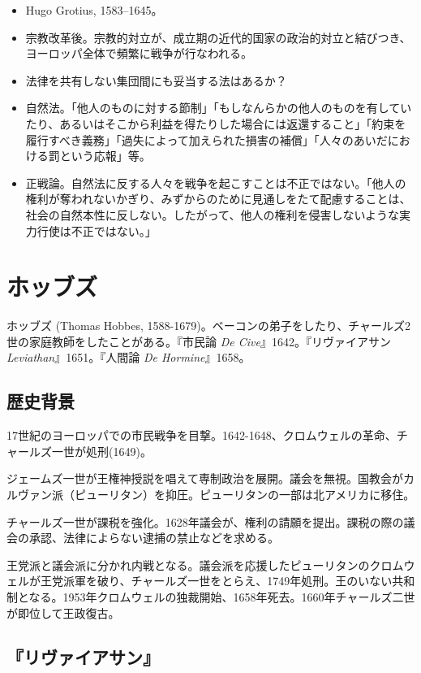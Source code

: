 \documentclass[uplatex,dvipdfmx]{jsarticle} \usepackage{mystyle}%
\begin{document}
 \begin{itemize}
 \item Hugo Grotius, 1583--1645。
 \item 宗教改革後。宗教的対立が、成立期の近代的国家の政治的対立と結びつき、ヨーロッパ全体で頻繁に戦争が行なわれる。
 \item 法律を共有しない集団間にも妥当する法はあるか？
 \item 自然法。「他人のものに対する節制」「もしなんらかの他人のものを有していたり、あるいはそこから利益を得たりした場合には返還すること」「約束を履行すべき義務」「過失によって加えられた損害の補償」「人々のあいだにおける罰という応報」等。
 \item 正戦論。自然法に反する人々を戦争を起こすことは不正ではない。「他人の権利が奪われないかぎり、みずからのために見通しをたて配慮することは、社会の自然本性に反しない。したがって、他人の権利を侵害しないような実力行使は不正ではない。」
 \end{itemize}

\section{ホッブズ}

ホッブズ (Thomas Hobbes, 1588-1679)。ベーコンの弟子をしたり、チャールズ2世の家庭教師をしたことがある。『市民論 \emph{De Cive}』1642。『リヴァイアサン \emph{Leviathan}』1651。『人間論 \emph{De Hormine}』1658。

\subsection{歴史背景}




17世紀のヨーロッパでの市民戦争を目撃。1642-1648、クロムウェルの革命、チャールズ一世が処刑(1649)。

ジェームズ一世が王権神授説を唱えて専制政治を展開。議会を無視。国教会がカルヴァン派（ピューリタン）を抑圧。ピューリタンの一部は北アメリカに移住。

チャールズ一世が課税を強化。1628年議会が、権利の請願を提出。課税の際の議会の承認、法律によらない逮捕の禁止などを求める。

王党派と議会派に分かれ内戦となる。議会派を応援したピューリタンのクロムウェルが王党派軍を破り、チャールズ一世をとらえ、1749年処刑。王のいない共和制となる。1953年クロムウェルの独裁開始、1658年死去。1660年チャールズ二世が即位して王政復古。


\subsection{『リヴァイアサン』}
\end{document}
